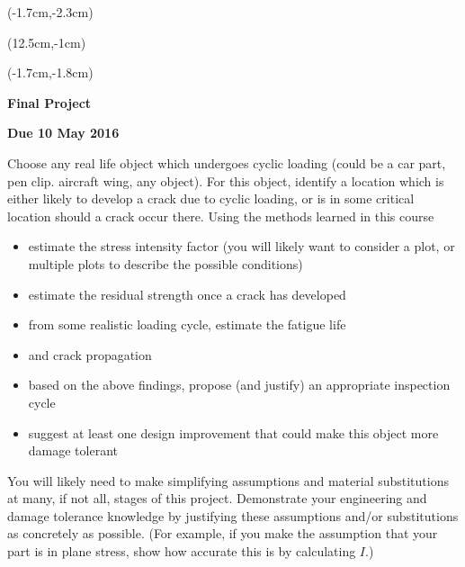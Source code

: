 \documentclass[12pt, oneside]{article}
\begin{document}


\begin{textblock*}{4cm}(-1.7cm,-2.3cm)
\end{textblock*}

\begin{textblock*}{8cm}(12.5cm,-1cm)
\end{textblock*}
\begin{textblock*}{13.5cm}(-1.7cm,-1.8cm)
\end{textblock*}

\vspace{1cm}

\begin{center}
\textbf{\Large Final Project}

\textbf{Due 10 May 2016}
\end{center}

Choose any real life object which undergoes cyclic loading (could be a car part, pen clip. aircraft wing, any object).
For this object, identify a location which is either likely to develop a crack due to cyclic loading, or is in some critical location should a crack occur there.
Using the methods learned in this course
\begin{itemize}
	\item estimate the stress intensity factor (you will likely want to consider a plot, or multiple plots to describe the possible conditions)
	\item estimate the residual strength once a crack has developed
	\item from some realistic loading cycle, estimate the fatigue life
	\item and crack propagation
	\item based on the above findings, propose (and justify) an appropriate inspection cycle
	\item suggest at least one design improvement that could make this object more damage tolerant
\end{itemize}

You will likely need to make simplifying assumptions and material substitutions at many, if not all, stages of this project.
Demonstrate your engineering and damage tolerance knowledge by justifying these assumptions and/or substitutions as concretely as possible.
(For example, if you make the assumption that your part is in plane stress, show how accurate this is by calculating $I$.)
\end{document}
